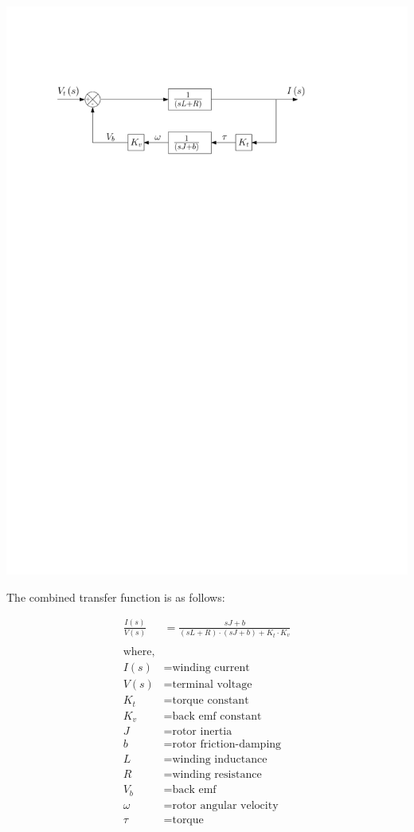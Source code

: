 \documentclass{report}
\begin{document}
\includegraphics{dc_motor_transfer_fn}

The combined transfer function is as follows:

\begin{align}
\frac{I\left(s\right)}{V\left(s\right)} &= \frac{sJ + b}{(sL + R)\cdot(sJ + b) + K_t \cdot K_v} \label{eq:motor_plant_transfer_fn} \\
\nonumber \\
\text{where,} \nonumber \\
I(s) &= \text{winding current} \nonumber \\
V(s) &= \text{terminal voltage} \nonumber \\
K_t &= \text{torque constant} \nonumber \\
K_v &= \text{back emf constant} \nonumber \\
J &= \text{rotor inertia} \nonumber\\
b &= \text{rotor friction-damping} \nonumber \\
L &= \text{winding inductance} \nonumber \\
R &= \text{winding resistance} \nonumber \\
V_b &= \text{back emf} \nonumber \\
\omega &= \text{rotor angular velocity} \nonumber \\
\tau &= \text{torque} \nonumber
\end{align}
\end{document}
